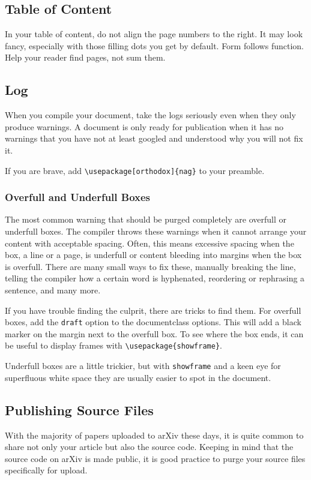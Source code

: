 \subsection{Table of Content}
In your table of content, do not align the page numbers to the right.
It may look fancy, especially with those filling dots you get by default.
Form follows function. Help your reader find pages, not sum them.

\subsection{Log}
When you compile your document, take the logs seriously even when they only produce warnings.
A document is only ready for publication when it has no warnings that you have not at least googled and understood why you will not fix it.

If you are brave, add \verb|\usepackage[orthodox]{nag}| to your preamble.

\subsubsection{Overfull and Underfull Boxes}
The most common warning that should be purged completely are overfull or underfull boxes.
The compiler throws these warnings when it cannot arrange your content with acceptable spacing.
Often, this means excessive spacing when the box, a line or a page, is underfull or content bleeding into margins when the box is overfull.
There are many small ways to fix these, manually breaking the line, telling the compiler how a certain word is hyphenated, reordering or rephrasing a sentence, and many more.

If you have trouble finding the culprit, there are tricks to find them.
For overfull boxes, add the \verb|draft| option to the documentclass options.
This will add a black marker on the margin next to the overfull box.
To see where the box ends, it can be useful to display frames with \verb|\usepackage{showframe}|.

Underfull boxes are a little trickier, but with \verb|showframe| and a keen eye for superfluous white space they are usually easier to spot in the document.	

\subsection{Publishing Source Files}
With the majority of papers uploaded to arXiv these days, it is quite common to share not only your article but also the source code.
Keeping in mind that the source code on arXiv is made public, it is good practice to purge your source files specifically for upload.


